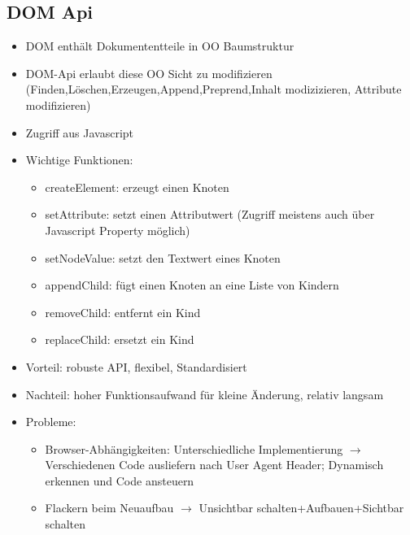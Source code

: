 \documentclass{article} %
\begin{document}
	\subsection{DOM Api}
	\begin{itemize}
		\item DOM enthält Dokumententteile in OO Baumstruktur
		\item DOM-Api erlaubt diese OO Sicht zu modifizieren (Finden,Löschen,Erzeugen,Append,Preprend,Inhalt modizizieren, Attribute modifizieren)
		\item Zugriff aus Javascript
		\item Wichtige Funktionen:
		\begin{itemize}
			\item createElement: erzeugt einen Knoten
			\item setAttribute: setzt einen Attributwert (Zugriff meistens auch über Javascript Property möglich)
			\item setNodeValue: setzt den Textwert eines Knoten
			\item appendChild: fügt einen Knoten an eine Liste von Kindern
			\item removeChild: entfernt ein Kind
			\item replaceChild: ersetzt ein Kind
		\end{itemize}
		\item Vorteil: robuste API, flexibel, Standardisiert
		\item Nachteil: hoher Funktionsaufwand für kleine Änderung, relativ langsam 
		\item Probleme:
		\begin{itemize}
			\item Browser-Abhängigkeiten: Unterschiedliche Implementierung $\rightarrow$ Verschiedenen Code ausliefern nach User Agent Header; Dynamisch erkennen und Code ansteuern
			\item Flackern beim Neuaufbau $\rightarrow$ Unsichtbar schalten+Aufbauen+Sichtbar schalten
		\end{itemize}
	\end{itemize}
\end{document}
